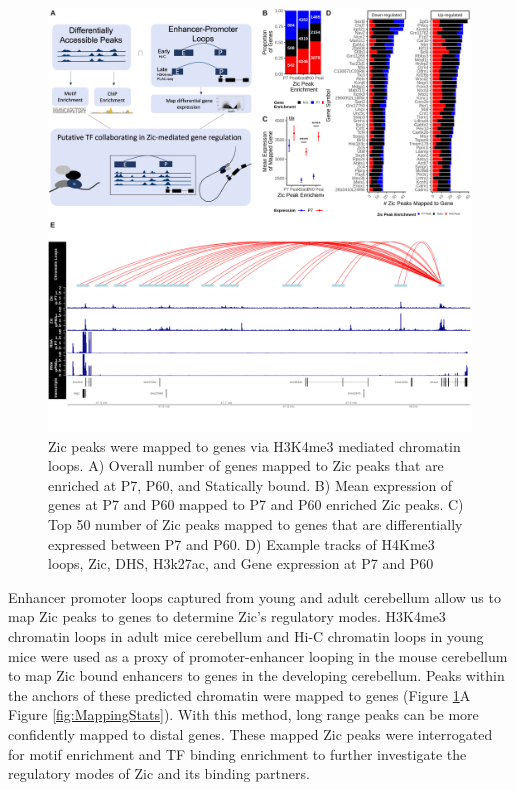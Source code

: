 \documentclass[fleqn,10pt,twocolumn]{wlscirep}
\begin{document}
\begin{figure}[!ht]
\includegraphics[width=.95\textwidth]{Figures/figure3.png}
\caption{Zic peaks were mapped to genes via H3K4me3 mediated chromatin loops. A) Overall number of genes mapped to Zic peaks that are enriched at P7, P60, and Statically bound. B) Mean expression of genes at P7 and P60 mapped to P7 and P60 enriched Zic peaks. C) Top 50 number of Zic peaks mapped to genes that are differentially expressed between P7 and P60. D) Example tracks of H4Kme3 loops, Zic, DHS, H3k27ac, and Gene expression at P7 and P60}
\label{fig:PeakMapping}
\end{figure}

Enhancer promoter loops captured from young and adult cerebellum allow us to map Zic peaks to genes to determine Zic's regulatory modes. H3K4me3 chromatin loops in adult mice cerebellum \cite{Yamada2019SensoryLearning} and Hi-C chromatin loops in young mice \cite{Goodman2020TheBrain}  were used as a proxy of promoter-enhancer looping in the mouse cerebellum  to map Zic bound enhancers to genes in the developing cerebellum. Peaks within the anchors of these predicted chromatin were mapped to genes (Figure \ref{fig:PeakMapping}A Figure \ref{fig:MappingStats}). With this method, long range peaks can be more confidently mapped to distal genes. These mapped Zic peaks were interrogated for motif enrichment and TF binding enrichment to further investigate the regulatory modes of Zic and its binding partners. 
\end{document}
